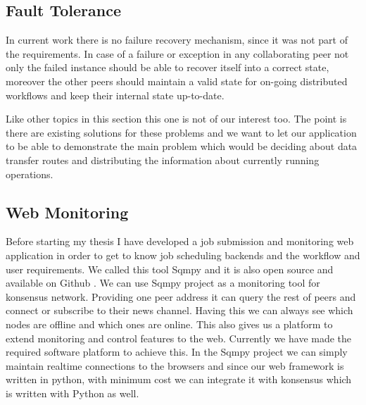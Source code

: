 \subsection{Fault Tolerance}
In current work there is no failure recovery mechanism, since it was not part of the requirements. In case of a failure or exception in any 
collaborating peer not only the failed instance should be able to recover itself into a correct state, moreover the other peers should maintain
a valid state for on-going distributed workflows and keep their internal state up-to-date.

Like other topics in this section this one is not of our interest too.
The point is there are existing solutions for these problems 
and we want to let our application to be able to demonstrate the main problem which would be 
deciding about data transfer routes and distributing the information about currently running operations.

\subsection{Web Monitoring}
Before starting my thesis I have developed a job submission and monitoring web application in order to get to know 
job scheduling backends and the workflow and user requirements. We called this tool Sqmpy and it is also open source and
available on Github \cite{sqmpy}. We can use Sqmpy project as a monitoring tool for konsensus network.
Providing one peer address it can query the rest of peers and connect or 
subscribe to their news channel. Having this we can always see which nodes are
offline and which ones are online. This also gives us a platform to extend
monitoring and control features to the web. Currently we have made the 
required software platform to achieve this. In the Sqmpy project we can simply maintain realtime connections to the browsers and since
our web framework is written in python, with minimum cost we can integrate it with konsensus which is written with Python as well.